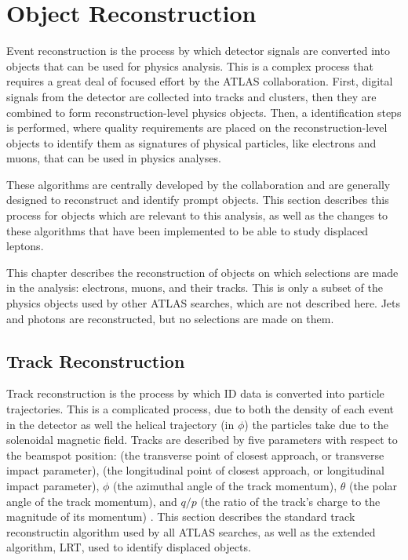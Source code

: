 \chapter{Object Reconstruction}
\label{chap:eventreco}

Event reconstruction is the process by which detector signals are converted into objects that can be used for physics analysis. This is a complex process that requires a great deal of focused effort by the \ac{ATLAS} collaboration. First, digital signals from the detector are collected into tracks and clusters, then they are combined to form reconstruction-level physics objects. Then, a identification steps is performed, where quality requirements are placed on the reconstruction-level objects to identify them as signatures of physical particles, like electrons and muons, that can be used in physics analyses. 

These algorithms are centrally developed by the collaboration and are generally designed to reconstruct and identify prompt objects. This section describes this process for objects which are relevant to this analysis, as well as the changes to these algorithms that have been implemented to be able to study displaced leptons.  

This chapter describes the reconstruction of objects on which selections are made in the analysis: electrons, muons, and their tracks. This is only a subset of the physics objects used by other \ac{ATLAS} searches, which are not described here. Jets and photons are reconstructed, but no selections are made on them.


\section{Track Reconstruction}
\label{sec:trackreco}

Track reconstruction is the process by which \ac{ID} data is converted into particle trajectories. This is a complicated process, due to both the density of each event in the detector as well the helical trajectory (in $\phi$) the particles take due to the solenoidal magnetic field. Tracks are described by five parameters with respect to the beamspot position: \dzero (the transverse point of closest approach, or transverse impact parameter), \zzero (the longitudinal point of closest approach, or longitudinal impact parameter), $\phi$ (the azimuthal angle of the track momentum), $\theta$ (the polar angle of the track momentum), and $q/p$ (the ratio of the track's charge to the magnitude of its momentum) \cite{track-algo}. This section describes the standard track reconstructin algorithm used by all \ac{ATLAS} searches, as well as the extended algorithm, \ac{LRT}, used to identify displaced objects.


